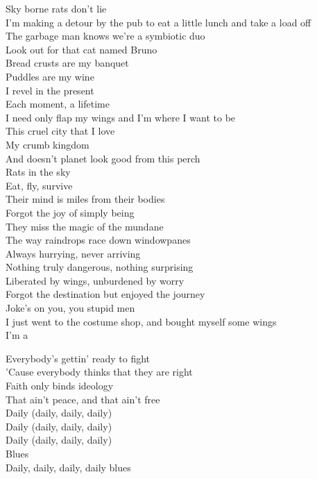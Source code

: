 Sky borne rats don't lie \\
I'm making a detour by the pub to eat a little lunch and take a load off \\
The garbage man knows we're a symbiotic duo \\
Look out for that cat named Bruno \\

Bread crusts are my banquet \\
Puddles are my wine \\
I revel in the present \\
Each moment, a lifetime \\
I need only flap my wings and I'm where I want to be \\
This cruel city that I love \\
My crumb kingdom \\
And doesn't planet  look good from this perch \\
Rats in the sky \\
Eat, fly, survive \\

Their mind is miles from their bodies \\
Forgot the joy of simply being \\
They miss the magic of the mundane \\
The way raindrops race down windowpanes \\
Always hurrying, never arriving \\
Nothing truly dangerous, nothing surprising \\
Liberated by wings, unburdened by worry \\
Forgot the destination but enjoyed the journey \\

Joke's on you, you stupid men \\
I just went to the costume shop, and bought myself some wings \\
I'm a  \\



Everybody's gettin' ready to fight \\
'Cause everybody thinks that they are right \\
Faith only binds ideology \\
That ain't peace, and that ain't free \\
Daily (daily, daily, daily) \\
Daily (daily, daily, daily) \\
Daily (daily, daily, daily) \\
Blues \\
Daily, daily, daily, daily blues \\

